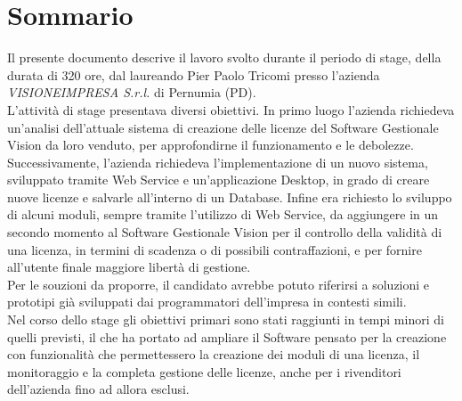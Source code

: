 
\cleardoublepage
{}
{}
\begingroup
\let\clearpage\relax
\let\cleardoublepage\relax
\let\cleardoublepage\relax

\chapter*{Sommario}

Il presente documento descrive il lavoro svolto durante il periodo di stage, della durata di 320 ore, dal laureando Pier Paolo Tricomi presso l'azienda \textit{VISIONEIMPRESA S.r.l.} di Pernumia (PD).
\\
L'attività di stage presentava diversi obiettivi. In primo luogo l'azienda richiedeva un'analisi dell'attuale sistema di creazione delle licenze del Software Gestionale Vision da loro venduto, per approfondirne il funzionamento e le debolezze. Successivamente, l'azienda richiedeva l'implementazione di un nuovo sistema, sviluppato tramite Web Service e un'applicazione Desktop, in grado di creare nuove licenze e salvarle all'interno di un Database. Infine era richiesto lo sviluppo di alcuni moduli, sempre tramite l'utilizzo di Web Service, da aggiungere in un secondo momento al Software Gestionale Vision per il controllo della validità di una licenza, in termini di scadenza o di possibili contraffazioni, e per fornire all'utente finale maggiore libertà di gestione.\\
Per le souzioni da proporre, il candidato avrebbe potuto riferirsi a soluzioni e prototipi già sviluppati dai programmatori dell'impresa in contesti simili.
\\Nel corso dello stage gli obiettivi primari sono stati raggiunti in tempi minori di quelli previsti, il che ha portato ad ampliare il Software pensato per la creazione con funzionalità che permettessero la creazione dei moduli di una licenza, il monitoraggio e la completa gestione delle licenze, anche per i rivenditori dell'azienda fino ad allora esclusi.
%
%

\endgroup			

\vfill

